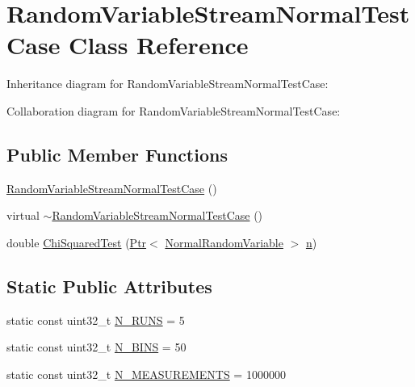 \hypertarget{classRandomVariableStreamNormalTestCase}{}\section{Random\+Variable\+Stream\+Normal\+Test\+Case Class Reference}
\label{classRandomVariableStreamNormalTestCase}


Inheritance diagram for Random\+Variable\+Stream\+Normal\+Test\+Case\+:


Collaboration diagram for Random\+Variable\+Stream\+Normal\+Test\+Case\+:
\subsection*{Public Member Functions}
\begin{DoxyCompactItemize}
\item 
\hyperlink{classRandomVariableStreamNormalTestCase_ad17e19073670ed2f5246c0a4675b8cc4}{Random\+Variable\+Stream\+Normal\+Test\+Case} ()
\item 
virtual \hyperlink{classRandomVariableStreamNormalTestCase_a3d97a42d2a7c0171ab361adf294cce81}{$\sim$\+Random\+Variable\+Stream\+Normal\+Test\+Case} ()
\item 
double \hyperlink{classRandomVariableStreamNormalTestCase_a4217d718d419aead140f0204f74990de}{Chi\+Squared\+Test} (\hyperlink{classns3_1_1Ptr}{Ptr}$<$ \hyperlink{classns3_1_1NormalRandomVariable}{Normal\+Random\+Variable} $>$ \hyperlink{lte__link__budget__x2__handover__measures_8m_abdb05bc5a064cf642a06c83b3392f148}{n})
\end{DoxyCompactItemize}
\subsection*{Static Public Attributes}
\begin{DoxyCompactItemize}
\item 
static const uint32\+\_\+t \hyperlink{classRandomVariableStreamNormalTestCase_a6ba9c6a6a0f6f62446ddb88804fde2bd}{N\+\_\+\+R\+U\+NS} = 5
\item 
static const uint32\+\_\+t \hyperlink{classRandomVariableStreamNormalTestCase_a0adaeedb952b593d21ebd9915597837d}{N\+\_\+\+B\+I\+NS} = 50
\item 
static const uint32\+\_\+t \hyperlink{classRandomVariableStreamNormalTestCase_a8aa4e12111094e204d6019bb0c48b4cf}{N\+\_\+\+M\+E\+A\+S\+U\+R\+E\+M\+E\+N\+TS} = 1000000
\end{DoxyCompactItemize}
